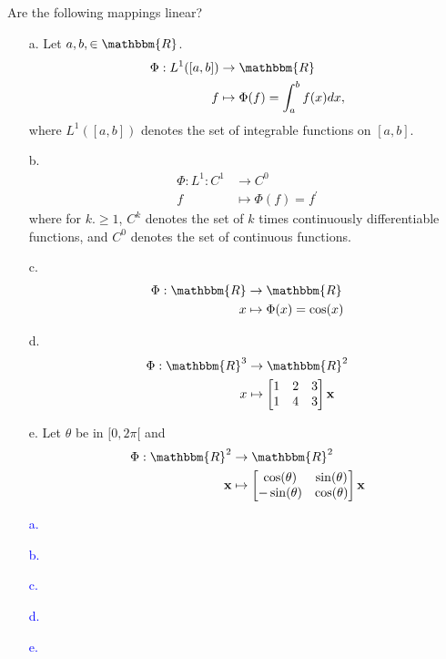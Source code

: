 \documentclass[a4paper,12pt]{article}
\newcommand{\R}{\mathbbm{R}}
\newcommand{\M}[1]{ \begin{bmatrix} #1 \end{bmatrix} }
\newcommand{\vecx}{\textbf{x}}
\newcommand{\pr}{^\prime}
\begin{document}
\subsection{}
Are the following mappings linear?
\begin{itemize}
 \item [a.] Let $a,b, \in \R$.
                \begin{align*}
                \Phi: L^1([a,b]) &\rightarrow \R \\
                f &\mapsto \Phi(f) = \int_a^b f(x)dx,
                \end{align*}
                where $L^1([a,b])$ denotes the set of integrable functions on $[a,b]$.
 \item [b.] \begin{align*}
                \Phi: L^1: C^1 &\rightarrow C^0\\
                f &\mapsto \Phi(f) = f\pr
                \end{align*}
                where for $k. \geq 1$, $C^k$ denotes the set of $k$ times continuously differentiable functions, and $C^0$ denotes the set of continuous functions.
 \item [c.] \begin{align*}
                \Phi: \R &\rightarrow \R \\
                x &\mapsto \Phi(x) = \cos(x)
                \end{align*}
 \item [d.] \begin{align*}
                \Phi: \R^3 &\rightarrow \R^2 \\
                x &\mapsto \M{1&2&3\\1&4&3}\vecx
                \end{align*}
 \item [e.] Let $\theta$ be in $[0,2\pi[$ and 
                \begin{align*}
                \Phi: \R^2 &\rightarrow \R^2 \\
                \vecx &\mapsto \M{\cos(\theta)&\sin(\theta)\\-\sin(\theta)&\cos(\theta)} \vecx
                \end{align*}
\end{itemize}
\textcolor{blue}{
\begin{itemize}
 \item [a.] 
 \item [b.] 
 \item [c.] 
 \item [d.] 
 \item [e.]
\end{itemize}
}
\end{document}

